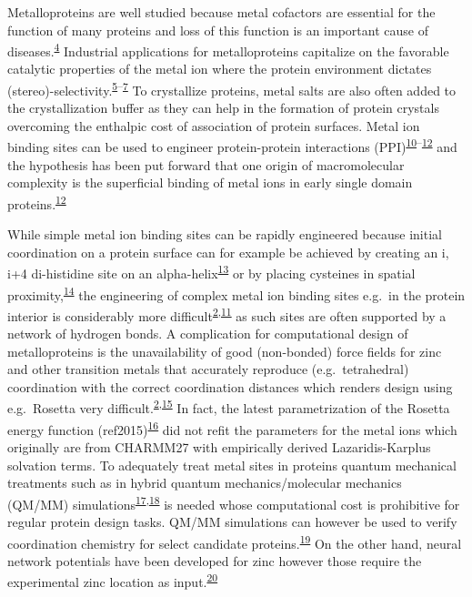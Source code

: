 \documentclass[  ASAPversion,
  ,
  9pt]{elife}
\begin{document}
Metalloproteins are well studied because metal cofactors are essential for the function of many proteins and loss of this function is an important cause of diseases.\textsuperscript{\protect\hyperlink{ref-4sXp2sDw}{4}} Industrial applications for metalloproteins capitalize on the favorable catalytic properties of the metal ion where the protein environment dictates (stereo)-selectivity.\textsuperscript{\protect\hyperlink{ref-oOm5j05D}{5}--\protect\hyperlink{ref-13w4SiWCx}{7}} To crystallize proteins, metal salts are also often added to the crystallization buffer as they can help in the formation of protein crystals overcoming the enthalpic cost of association of protein surfaces. Metal ion binding sites can be used to engineer protein-protein interactions (PPI)\textsuperscript{\protect\hyperlink{ref-ROLANnJl}{10}--\protect\hyperlink{ref-17JMFzNJo}{12}} and the hypothesis has been put forward that one origin of macromolecular complexity is the superficial binding of metal ions in early single domain proteins.\textsuperscript{\protect\hyperlink{ref-17JMFzNJo}{12}}

While simple metal ion binding sites can be rapidly engineered because initial coordination on a protein surface can for example be achieved by creating an i, i+4 di-histidine site on an alpha-helix\textsuperscript{\protect\hyperlink{ref-io987fKE}{13}} or by placing cysteines in spatial proximity,\textsuperscript{\protect\hyperlink{ref-JXKFLH3I}{14}} the engineering of complex metal ion binding sites e.g.~in the protein interior is considerably more difficult\textsuperscript{\protect\hyperlink{ref-LY9UGI7}{2},\protect\hyperlink{ref-Lj2sbjzc}{11}} as such sites are often supported by a network of hydrogen bonds. A complication for computational design of metalloproteins is the unavailability of good (non-bonded) force fields for zinc and other transition metals that accurately reproduce (e.g.~tetrahedral) coordination with the correct coordination distances which renders design using e.g.~Rosetta very difficult.\textsuperscript{\protect\hyperlink{ref-LY9UGI7}{2},\protect\hyperlink{ref-1FR3e6DyA}{15}} In fact, the latest parametrization of the Rosetta energy function (ref2015)\textsuperscript{\protect\hyperlink{ref-1uPiiMnD}{16}} did not refit the parameters for the metal ions which originally are from CHARMM27 with empirically derived Lazaridis-Karplus solvation terms. To adequately treat metal sites in proteins quantum mechanical treatments such as in hybrid quantum mechanics/molecular mechanics (QM/MM) simulations\textsuperscript{\protect\hyperlink{ref-5Vxh8hay}{17},\protect\hyperlink{ref-IXq7vmo3}{18}} is needed whose computational cost is prohibitive for regular protein design tasks. QM/MM simulations can however be used to verify coordination chemistry for select candidate proteins.\textsuperscript{\protect\hyperlink{ref-nlfa683y}{19}} On the other hand, neural network potentials have been developed for zinc however those require the experimental zinc location as input.\textsuperscript{\protect\hyperlink{ref-b5EJeHX3}{20}}
\end{document}
